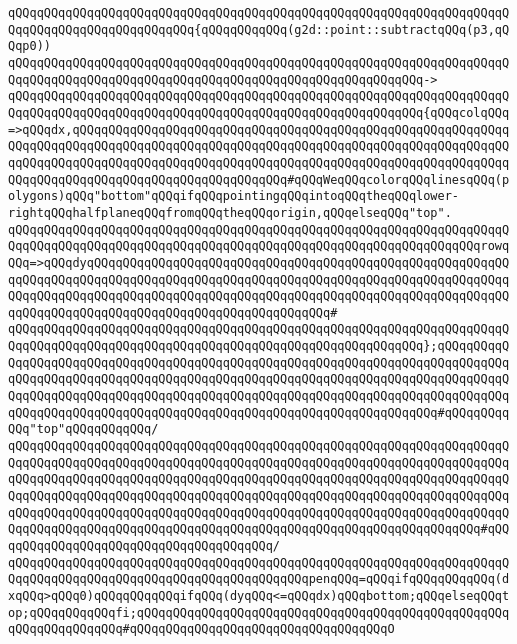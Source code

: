\verb|qQQqqQQqqQQqqQQqqQQqqQQqqQQqqQQqqQQqqQQqqQQqqQQqqQQqqQQqqQQqqQQqqQQqqQQqqQQqqQQqqQQqqQQqqQQqqQQq{qQQqqQQqqQQq(g2d::point::subtractqQQq(p3,qQQqp0))|\newline
\verb|qQQqqQQqqQQqqQQqqQQqqQQqqQQqqQQqqQQqqQQqqQQqqQQqqQQqqQQqqQQqqQQqqQQqqQQqqQQqqQQqqQQqqQQqqQQqqQQqqQQqqQQqqQQqqQQqqQQqqQQqqQQqqQQq->|\newline
\verb|qQQqqQQqqQQqqQQqqQQqqQQqqQQqqQQqqQQqqQQqqQQqqQQqqQQqqQQqqQQqqQQqqQQqqQQqqQQqqQQqqQQqqQQqqQQqqQQqqQQqqQQqqQQqqQQqqQQqqQQqqQQqqQQq{qQQqcolqQQq=>qQQqdx,qQQqqQQqqQQqqQQqqQQqqQQqqQQqqQQqqQQqqQQqqQQqqQQqqQQqqQQqqQQqqQQqqQQqqQQqqQQqqQQqqQQqqQQqqQQqqQQqqQQqqQQqqQQqqQQqqQQqqQQqqQQqqQQqqQQqqQQqqQQqqQQqqQQqqQQqqQQqqQQqqQQqqQQqqQQqqQQqqQQqqQQqqQQqqQQqqQQqqQQqqQQqqQQqqQQqqQQqqQQqqQQqqQQqqQQqqQQqqQQq#qQQqWeqQQqcolorqQQqlinesqQQq(polygons)qQQq"bottom"qQQqifqQQqpointingqQQqintoqQQqtheqQQqlower-rightqQQqhalfplaneqQQqfromqQQqtheqQQqorigin,qQQqelseqQQq"top".|\newline
\verb|qQQqqQQqqQQqqQQqqQQqqQQqqQQqqQQqqQQqqQQqqQQqqQQqqQQqqQQqqQQqqQQqqQQqqQQqqQQqqQQqqQQqqQQqqQQqqQQqqQQqqQQqqQQqqQQqqQQqqQQqqQQqqQQqqQQqqQQqrowqQQq=>qQQqdyqQQqqQQqqQQqqQQqqQQqqQQqqQQqqQQqqQQqqQQqqQQqqQQqqQQqqQQqqQQqqQQqqQQqqQQqqQQqqQQqqQQqqQQqqQQqqQQqqQQqqQQqqQQqqQQqqQQqqQQqqQQqqQQqqQQqqQQqqQQqqQQqqQQqqQQqqQQqqQQqqQQqqQQqqQQqqQQqqQQqqQQqqQQqqQQqqQQqqQQqqQQqqQQqqQQqqQQqqQQqqQQqqQQqqQQqqQQqqQQqqQQq#|\newline
\verb|qQQqqQQqqQQqqQQqqQQqqQQqqQQqqQQqqQQqqQQqqQQqqQQqqQQqqQQqqQQqqQQqqQQqqQQqqQQqqQQqqQQqqQQqqQQqqQQqqQQqqQQqqQQqqQQqqQQqqQQqqQQqqQQq};qQQqqQQqqQQqqQQqqQQqqQQqqQQqqQQqqQQqqQQqqQQqqQQqqQQqqQQqqQQqqQQqqQQqqQQqqQQqqQQqqQQqqQQqqQQqqQQqqQQqqQQqqQQqqQQqqQQqqQQqqQQqqQQqqQQqqQQqqQQqqQQqqQQqqQQqqQQqqQQqqQQqqQQqqQQqqQQqqQQqqQQqqQQqqQQqqQQqqQQqqQQqqQQqqQQqqQQqqQQqqQQqqQQqqQQqqQQqqQQqqQQqqQQqqQQqqQQqqQQqqQQqqQQqqQQqqQQqqQQq#qQQqqQQqqQQq"top"qQQqqQQqqQQq/|\newline
\verb|qQQqqQQqqQQqqQQqqQQqqQQqqQQqqQQqqQQqqQQqqQQqqQQqqQQqqQQqqQQqqQQqqQQqqQQqqQQqqQQqqQQqqQQqqQQqqQQqqQQqqQQqqQQqqQQqqQQqqQQqqQQqqQQqqQQqqQQqqQQqqQQqqQQqqQQqqQQqqQQqqQQqqQQqqQQqqQQqqQQqqQQqqQQqqQQqqQQqqQQqqQQqqQQqqQQqqQQqqQQqqQQqqQQqqQQqqQQqqQQqqQQqqQQqqQQqqQQqqQQqqQQqqQQqqQQqqQQqqQQqqQQqqQQqqQQqqQQqqQQqqQQqqQQqqQQqqQQqqQQqqQQqqQQqqQQqqQQqqQQqqQQqqQQqqQQqqQQqqQQqqQQqqQQqqQQqqQQqqQQqqQQqqQQqqQQqqQQqqQQqqQQqqQQqqQQqqQQq#qQQqqQQqqQQqqQQqqQQqqQQqqQQqqQQqqQQqqQQq/|\newline
\verb|qQQqqQQqqQQqqQQqqQQqqQQqqQQqqQQqqQQqqQQqqQQqqQQqqQQqqQQqqQQqqQQqqQQqqQQqqQQqqQQqqQQqqQQqqQQqqQQqqQQqqQQqqQQqqQQqpenqQQq=qQQqifqQQqqQQqqQQq(dxqQQq>qQQq0)qQQqqQQqqQQqifqQQq(dyqQQq<=qQQqdx)qQQqbottom;qQQqelseqQQqtop;qQQqqQQqqQQqfi;qQQqqQQqqQQqqQQqqQQqqQQqqQQqqQQqqQQqqQQqqQQqqQQqqQQqqQQqqQQqqQQqqQQq#qQQqqQQqqQQqqQQqqQQqqQQqqQQqqQQqqQQqO|\newline
